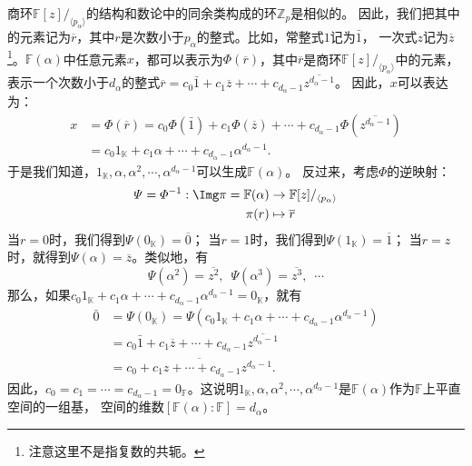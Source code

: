 \documentclass[12pt,UTF8]{ctexbook}
\begin{document}
\begin{appendix}
商环$\mathbb{F}[z] /_{\langle p_\alpha \rangle}$的结构和数论中的同余类构成的环$\mathbb{Z}_p$是相似的。
因此，我们把其中的元素记为$\overline{r}$，其中$r$是次数小于$p_\alpha$的整式。比如，常整式$1$记为$\bar{1}$，
一次式$z$记为$\overline{z}$\footnote{注意这里不是指复数的共轭。}。$\mathbb{F}(\alpha)$中任意元素$x$，都可以表示为$\varPhi(\overline{r})$，其中$\overline{r}$是商环$\mathbb{F}[z] /_{\langle p_\alpha \rangle}$中的元素，
表示一个次数小于$d_\alpha$的整式$\overline{r} = c_0\bar{1} + c_1\overline{z} + \cdots + c_{d_{\alpha}-1} \overline{z^{d_{\alpha}-1}}$。
因此，$x$可以表达为：
\begin{align*}
    x &= \varPhi(\overline{r}) = c_0\varPhi(\bar{1}) + c_1\varPhi(\overline{z}) + \cdots + c_{d_{\alpha}-1} \varPhi(\overline{z^{d_{\alpha}-1}})  \\
    &= c_0 1_\mathbb{K} + c_1\alpha + \cdots + c_{d_{\alpha}-1} \alpha^{d_{\alpha}-1}.
\end{align*}
于是我们知道，$1_\mathbb{K}, \alpha, \alpha^2, \cdots , \alpha^{d_{\alpha}-1}$可以生成$\mathbb{F}(\alpha)$。
反过来，考虑$\varPhi$的逆映射：
\begin{align*}
    \varPsi = \varPhi^{-1} : \Img \pi = \mathbb{F}(\alpha) &\rightarrow \mathbb{F}[z] /_{\langle p_\alpha \rangle}  \\
     \pi(r)  &\mapsto \overline{r}  
\end{align*}
当$r = 0$时，我们得到$\varPsi(0_\mathbb{K}) = \overline{0}$；
当$r = 1$时，我们得到$\varPsi(1_\mathbb{K}) = \overline{1}$；
当$r = z$时，就得到$\varPsi(\alpha) = \overline{z}$。类似地，有
$$ \varPsi(\alpha^2) = \overline{z^2} , \,\,\, \varPsi(\alpha^3) = \overline{z^3} , \,\,\, \cdots $$
那么，如果$c_0 1_\mathbb{K} + c_1\alpha + \cdots + c_{d_{\alpha}-1} \alpha^{d_{\alpha}-1} = 0_\mathbb{K}$，就有
\begin{align*}
    \bar{0} &= \varPsi(0_\mathbb{K}) = \varPsi\left(c_0 1_\mathbb{K} + c_1\alpha + \cdots + c_{d_{\alpha}-1} \alpha^{d_{\alpha}-1}\right)  \\
    &= c_0\bar{1} + c_1\overline{z} + \cdots + c_{d_{\alpha}-1} \overline{z^{d_{\alpha}-1}}  \\
    &= \overline{c_0 + c_1z + \cdots + c_{d_{\alpha}-1} z^{d_{\alpha}-1}}. 
\end{align*}
因此，$c_0 = c_1 = \cdots = c_{d_{\alpha}-1} = 0_\mathbb{F}$。这说明$1_\mathbb{K}, \alpha, \alpha^2, \cdots , \alpha^{d_{\alpha}-1}$是$\mathbb{F}(\alpha)$作为$\mathbb{F}$上平直空间的一组基，
空间的维数$[\mathbb{F}(\alpha) : \mathbb{F}] = d_{\alpha}$。


\end{appendix}
\end{document}

